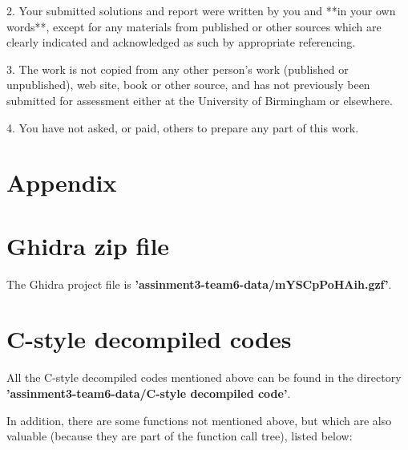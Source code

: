 \documentclass[11pt]{article}
\begin{document}
2. Your submitted solutions and report were written by you and **in your own words**, except for any materials from published or other sources which are clearly indicated and acknowledged as such by appropriate referencing.

3. The work is not copied from any other person's work (published or unpublished), web site, book or other source, and has not previously been submitted for assessment either at the University of Birmingham or elsewhere.

4. You have not asked, or paid, others to prepare any part of this work.

\newpage
\appendix
\section*{Appendix}


\section{Ghidra zip file}
The Ghidra project file is \textbf{'assinment3-team6-data/mYSCpPoHAih.gzf'}.

\section{C-style decompiled codes}
All the C-style decompiled codes mentioned above can be found in the
directory \textbf{'assinment3-team6-data/C-style decompiled code'}.

In addition, there are some functions not mentioned above, but which are also
valuable (because they are part of the function call tree), listed below:
\end{document}
